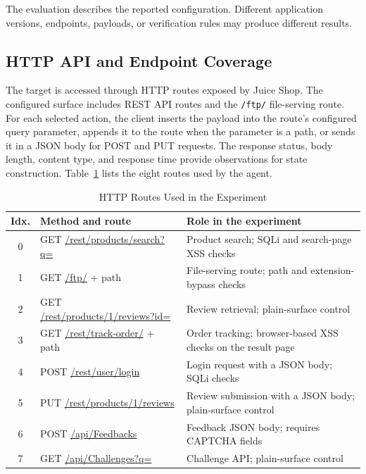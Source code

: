 \documentclass[conference]{IEEEtran}
\begin{document}
The evaluation describes the reported configuration.
Different application versions, endpoints, payloads, or
verification rules may produce different results.

\subsection{HTTP API and Endpoint Coverage}

The target is accessed through HTTP routes exposed by Juice
Shop. The configured surface includes REST API routes and the
\texttt{/ftp/} file-serving route. For each selected action,
the client inserts the payload into the route's configured
query parameter, appends it to the route when the parameter
is a path, or sends it in a JSON body for POST and PUT
requests. The response status, body length, content type,
and response time provide observations for state construction.
Table~\ref{tab:api-endpoints} lists the eight routes used by
the agent.

\begin{table}[!t]
\caption{HTTP Routes Used in the Experiment}
\label{tab:api-endpoints}
\centering
\footnotesize
\setlength{\tabcolsep}{3pt}
\begin{tabular}{c p{} p{}}
\toprule
\textbf{Idx.} & \textbf{Method and route} & \textbf{Role in the experiment}\\
\midrule
0 & GET \url{/rest/products/search?q=} & Product search; SQLi and search-page XSS checks\\
1 & GET \url{/ftp/} + path & File-serving route; path and extension-bypass checks\\
2 & GET \url{/rest/products/1/reviews?id=} & Review retrieval; plain-surface control\\
3 & GET \url{/rest/track-order/} + path & Order tracking; browser-based XSS checks on the result page\\
4 & POST \url{/rest/user/login} & Login request with a JSON body; SQLi checks\\
5 & PUT \url{/rest/products/1/reviews} & Review submission with a JSON body; plain-surface control\\
6 & POST \url{/api/Feedbacks} & Feedback JSON body; requires CAPTCHA fields\\
7 & GET \url{/api/Challenges?q=} & Challenge API; plain-surface control\\
\bottomrule
\end{tabular}
\end{table}
\setlength{\tabcolsep}{6pt}
\end{document}
